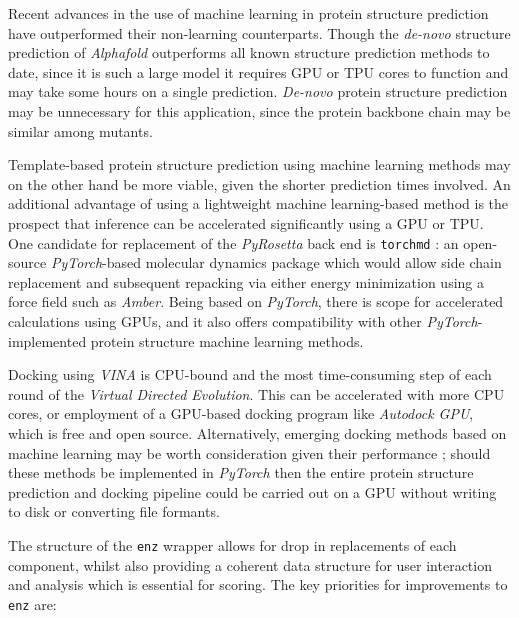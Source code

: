 \documentclass[16pt]{book}
\begin{document}
Recent advances in the use of machine learning in protein structure prediction \cite{jumper2021highly} have outperformed their non-learning counterparts.
Though the \textit{de-novo} structure prediction of \textit{Alphafold} \cite{jumper2021highly} outperforms all known structure prediction methods to date, since it is such a large model it requires GPU or TPU cores to function and may take some hours on a single prediction. 
\textit{De-novo} protein structure prediction may be unnecessary for this application, since the protein backbone chain may be similar among mutants.

Template-based protein structure prediction using machine learning methods may on the other hand be more viable, given the shorter prediction times involved.
An additional advantage of using a lightweight machine learning-based method is the prospect that inference can be accelerated significantly using a GPU or TPU.
One candidate for replacement of the \textit{PyRosetta} back end is \texttt{torchmd} \cite{doerr2021torchmd}: an open-source \textit{PyTorch}-based molecular dynamics package which would allow side chain replacement and subsequent repacking via either energy minimization using a force field such as \textit{Amber}\cite{wang2004development}.
Being based on \textit{PyTorch}, there is scope for accelerated calculations using GPUs, and it also offers compatibility with other \textit{PyTorch}-implemented protein structure machine learning methods.

Docking using \textit{VINA} is CPU-bound and the most time-consuming step of each round of the \textit{Virtual Directed Evolution}.
This can be accelerated with more CPU cores, or employment of a GPU-based docking program like \textit{Autodock GPU}\cite{santos2021accelerating}, which is free and open source.
Alternatively, emerging docking methods based on machine learning may be worth consideration given their performance \cite{doerr2021torchmd}; should these methods be implemented in \textit{PyTorch} then the entire protein structure prediction and docking pipeline could be carried out on a GPU without writing to disk or converting file formants.

The structure of the \texttt{enz} wrapper allows for drop in replacements of each component, whilst also providing a coherent data structure for user interaction and analysis which is essential for scoring.
The key priorities for improvements to \texttt{enz} are:
\end{document}
